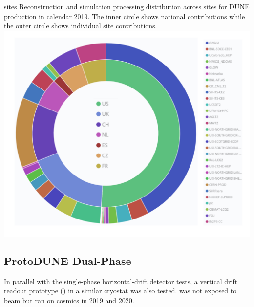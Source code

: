 \documentclass[../main-v1.tex]{subfiles}
\begin{document}
\begin{dunefigure}
{sites} %
{Reconstruction and simulation processing distribution across sites for DUNE production in calendar 2019.  The inner circle shows national contributions while the outer circle shows individual site contributions.}
\includegraphics[height=0.65\textwidth]{graphics/IntroFigures/Fig_8.pdf}
\end{dunefigure}

\subsection{ProtoDUNE Dual-Phase}


In parallel with the single-phase horizontal-drift detector tests, a vertical drift   readout prototype ()
in a similar cryostat was also  tested.   was not exposed to beam but ran on cosmics in 2019 and 2020. 
\end{document}
